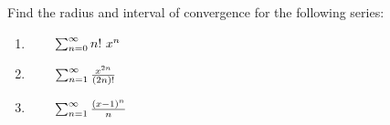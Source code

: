Find the radius and interval of convergence for the following series:




\begin{enumerate}[{Example }1:]
\addtocounter{enumi}{1}

\item \( \qquad \Sumzero n!\ x^n\)
\vfill


\item \( \qquad \sum_{n=1}^\infty \frac{x^{2n}}{(2n)!}\)
\vfill

\item \( \qquad \sum_{n=1}^\infty \frac{(x-1)^n}{n}\)
\vfill


%
%
\end{enumerate}

\pagebreak

